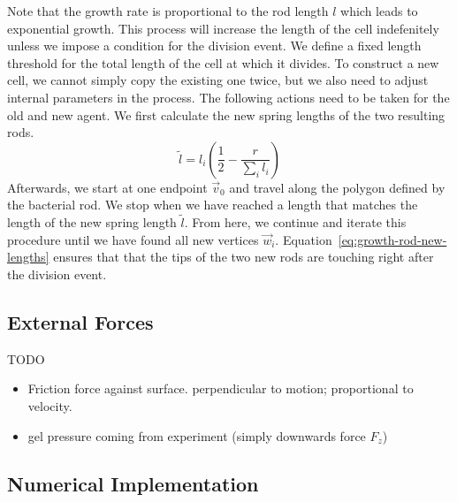 \documentclass{article}
\begin{document}
Note that the growth rate is proportional to the rod length $l$ which leads to exponential growth.
This process will increase the length of the cell indefenitely unless we impose a condition for the
division event.
We define a fixed length threshold for the total length of the cell at which it divides.
To construct a new cell, we cannot simply copy the existing one twice, but we also need to adjust
internal parameters in the process.
The following actions need to be taken for the old and new agent.
We first calculate the new spring lengths of the two resulting rods.
\begin{equation}
    \tilde{l} = l_i\left(\frac{1}{2} - \frac{r}{\sum\limits_i l_i}\right)
    \label{eq:growth-rod-new-lengths}
\end{equation}
Afterwards, we start at one endpoint $\vec{v}_0$ and travel along the polygon defined by the
bacterial rod.
We stop when we have reached a length that matches the length of the new spring length $\tilde{l}$.
From here, we continue and iterate this procedure until we have found all new vertices $\vec{w}_i$.
Equation~\ref{eq:growth-rod-new-lengths} ensures that that the tips of the two new rods are touching
right after the division event.

\subsection{External Forces}
TODO
\begin{itemize}
    \item Friction force against surface. perpendicular to motion; proportional to velocity.
    \item gel pressure coming from experiment (simply downwards force $F_z$)
\end{itemize}

\subsection{Numerical Implementation}
\end{document}
